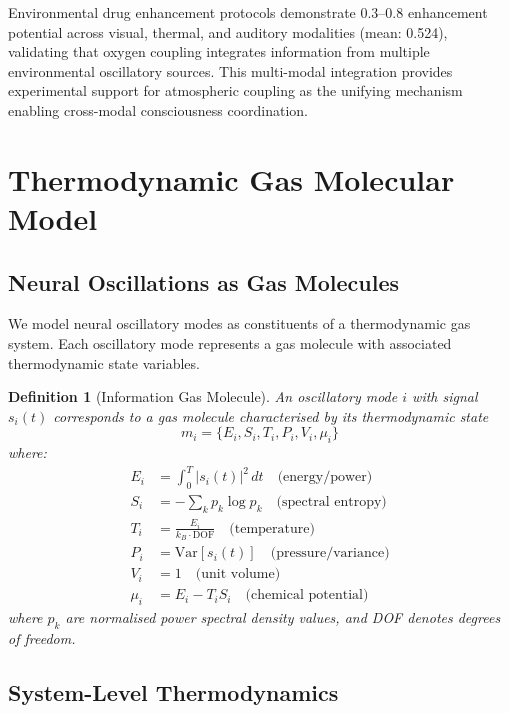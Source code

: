 \documentclass[12pt]{article}
\newtheorem{definition}[theorem]{Definition}
\theoremstyle{remark}
\begin{document}
Environmental drug enhancement protocols demonstrate 0.3--0.8 enhancement potential across visual, thermal, and auditory modalities (mean: 0.524), validating that oxygen coupling integrates information from multiple environmental oscillatory sources. This multi-modal integration provides experimental support for atmospheric coupling as the unifying mechanism enabling cross-modal consciousness coordination.

\section{Thermodynamic Gas Molecular Model}

\subsection{Neural Oscillations as Gas Molecules}

We model neural oscillatory modes as constituents of a thermodynamic gas system. Each oscillatory mode represents a gas molecule with associated thermodynamic state variables.

\begin{definition}[Information Gas Molecule]
An oscillatory mode $i$ with signal $s_i(t)$ corresponds to a gas molecule characterised by its thermodynamic state
\begin{equation}
m_i = \{E_i, S_i, T_i, P_i, V_i, \mu_i\}
\end{equation}
where:
\begin{align}
E_i &= \int_0^T |s_i(t)|^2 \, dt \quad \text{(energy/power)}\\
S_i &= -\sum_k p_k \log p_k \quad \text{(spectral entropy)}\\
T_i &= \frac{E_i}{k_B \cdot \text{DOF}} \quad \text{(temperature)}\\
P_i &= \text{Var}[s_i(t)] \quad \text{(pressure/variance)}\\
V_i &= 1 \quad \text{(unit volume)}\\
\mu_i &= E_i - T_i S_i \quad \text{(chemical potential)}
\end{align}
where $p_k$ are normalised power spectral density values, and DOF denotes degrees of freedom.
\end{definition}

\subsection{System-Level Thermodynamics}
\end{document}
